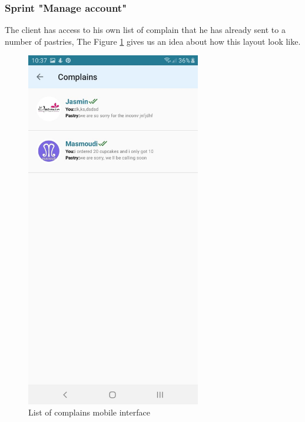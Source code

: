 \documentclass[12pt,a4paper]{report}
\begin{document}
\subsubsection*{Sprint "Manage account"}
The client has access to his own list of complain that he has already sent to a number of pastries, The Figure \ref{listcomplainsmobile-interface} gives us an idea about how this layout look like.
\begin{figure}[H]
	\centering
	\includegraphics[width=3in,keepaspectratio]{listcomplainsmobile.jpg}
	\caption{List of complains mobile interface}
	\label{listcomplainsmobile-interface}
\end{figure}
\clearpage
\end{document}
